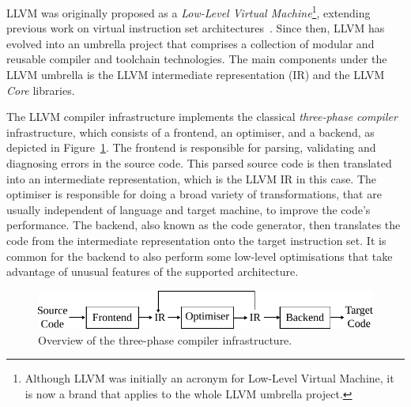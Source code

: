 LLVM was originally proposed as a \textit{Low-Level Virtual Machine}\footnote{Although LLVM was initially an acronym for Low-Level Virtual Machine, it is now a brand that applies to the whole LLVM umbrella project.}, extending previous work on virtual instruction set architectures~\citep{adve03,lattner04}.
Since then, LLVM has evolved into an umbrella project that comprises a collection of modular and reusable compiler and toolchain technologies.
The main components under the LLVM umbrella is the LLVM intermediate representation (IR) and the LLVM \textit{Core} libraries.

The LLVM compiler infrastructure implements the classical \textit{three-phase compiler} infrastructure, which consists of a frontend, an optimiser, and a backend, as depicted in Figure~\ref{fig:3-phase-compiler}.
The frontend is responsible for parsing, validating and diagnosing errors in the source code.
This parsed source code is then translated into an intermediate representation, which is the LLVM IR in this case.
The optimiser is responsible for doing a broad variety of transformations, that are usually independent of language and target machine, to improve the code's performance.
The backend, also known as the code generator, then translates the code from the intermediate representation onto the target instruction set.
It is common for the backend to also perform some low-level optimisations that take advantage of unusual features of the supported architecture.

\begin{figure}[h]
  \centering
  \includegraphics[scale=0.9]{figs/3-phase-compiler.pdf}
  \caption{Overview of the three-phase compiler infrastructure.}
  \label{fig:3-phase-compiler}
\end{figure}

